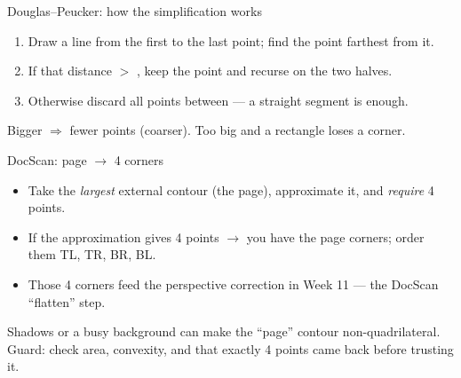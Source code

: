 \documentclass[10pt,aspectratio=169]{beamer}
\begin{document}
\begin{frame}{Douglas--Peucker: how the simplification works}
  \begin{center}
  \end{center}
  \begin{enumerate}
    \item Draw a line from the first to the last point; find the point farthest from it.
    \item If that distance $>$ , keep the point and recurse on the two halves.
    \item Otherwise discard all points between — a straight segment is enough.
  \end{enumerate}
  \begin{infobox}[Tuning]
    Bigger  $\Rightarrow$ fewer points (coarser). Too big and a rectangle loses a corner.
  \end{infobox}
\end{frame}

\begin{frame}{DocScan: page $\rightarrow$ 4 corners}
  \begin{itemize}
    \item Take the \emph{largest} external contour (the page), approximate it, and \emph{require} 4 points.
    \item If the approximation gives 4 points $\rightarrow$ you have the page corners; order them TL, TR, BR, BL.
    \item Those 4 corners feed the perspective correction in Week 11 — the DocScan ``flatten'' step.
  \end{itemize}
  \begin{badbox}
    Shadows or a busy background can make the ``page'' contour non-quadrilateral. Guard: check area,
    convexity, and that exactly 4 points came back before trusting it.
  \end{badbox}
\end{frame}
\end{document}
